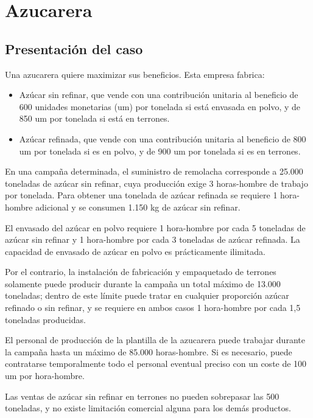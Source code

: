 \section{Azucarera}

\subsection{Presentación del caso}

Una azucarera quiere maximizar sus beneficios. Esta empresa fabrica:

\begin{itemize}
    \item Azúcar sin refinar, que vende con una contribución unitaria al beneficio de 600 unidades monetarias (um) por tonelada si está envasada en polvo, y de 850 um por tonelada si está en terrones.
    \item Azúcar refinada, que vende con una contribución unitaria al beneficio de 800 um por tonelada si es en polvo, y de 900 um por tonelada si es en terrones.
\end{itemize}

En una campaña determinada, el suministro de remolacha corresponde a 25.000 toneladas de azúcar sin refinar, cuya producción exige 3 horas-hombre de trabajo por tonelada.  
Para obtener una tonelada de azúcar refinada se requiere 1 hora-hombre adicional y se consumen 1.150 kg de azúcar sin refinar.  

El envasado del azúcar en polvo requiere 1 hora-hombre por cada 5 toneladas de azúcar sin refinar y 1 hora-hombre por cada 3 toneladas de azúcar refinada.  
La capacidad de envasado de azúcar en polvo es prácticamente ilimitada.  

Por el contrario, la instalación de fabricación y empaquetado de terrones solamente puede producir durante la campaña un total máximo de 13.000 toneladas; dentro de este límite puede tratar en cualquier proporción azúcar refinado o sin refinar, y se requiere en ambos casos 1 hora-hombre por cada 1,5 toneladas producidas.  

El personal de producción de la plantilla de la azucarera puede trabajar durante la campaña hasta un máximo de 85.000 horas-hombre.  
Si es necesario, puede contratarse temporalmente todo el personal eventual preciso con un coste de 100 um por hora-hombre.  

Las ventas de azúcar sin refinar en terrones no pueden sobrepasar las 500 toneladas, y no existe limitación comercial alguna para los demás productos.  

